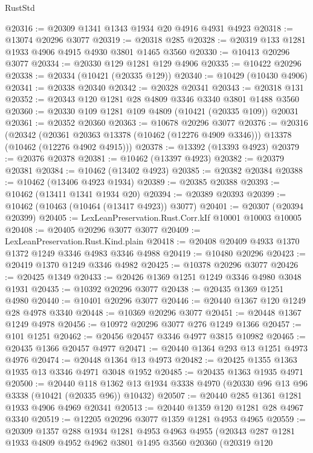 \begin{lexlean}{RustStd}
\begin{coremodule}
@20316 := @20309 @1341 @1343 @1934 @20 @4916 @4931 @4923
@20318 := @13074 @20296 @3077
@20319 := @20318 @285
@20328 := @20319 @133 @1281 @1933 @4906 @4915 @4930 @3801 @1465 @3560
@20330 := @10413 @20296 @3077
@20334 := @20330 @129 @1281 @129 @4906
@20335 := @10422 @20296
@20338 := @20334 (@10421 (@20335 @129))
@20340 := @10429 (@10430 @4906)
@20341 := @20338 @20340
@20342 := @20328 @20341
@20343 := @20318 @131
@20352 := @20343 @120 @1281 @28 @4809 @3346 @3340 @3801 @1488 @3560
@20360 := @20330 @109 @1281 @109 @4809 (@10421 (@20335 @109)) @20031
@20361 := @20352 @20360
@20363 := @10678 @20296 @3077
@20376 := @20316
    (@20342
      (@20361 @20363 @13378 (@10462 (@12276 @4909 @3346)))
      @13378
      (@10462 (@12276 @4902 @4915)))
@20378 := @13392 (@13393 @4923)
@20379 := @20376 @20378
@20381 := @10462 (@13397 @4923)
@20382 := @20379 @20381
@20384 := @10462 (@13402 @4923)
@20385 := @20382 @20384
@20388 := @10462 (@13406 @4923 @1934)
@20389 := @20385 @20388
@20393 := @10462 (@13411 @1341 @1934 @20)
@20394 := @20389 @20393
@20399 := @10462 (@10463 (@10464 (@13417 @4923)) @3077)
@20401 := @20307 (@20394 @20399)
@20405 := LexLeanPreservation.Rust.Corr.kIf @10001 @10003 @10005
@20408 := @20405 @20296 @3077 @3077
@20409 := LexLeanPreservation.Rust.Kind.plain
@20418 := @20408 @20409 @4933 @1370 @1372 @1249 @3346 @4983 @3346 @4988
@20419 := @10480 @20296
@20423 := @20419 @1370 @1249 @3346 @4982
@20425 := @10378 @20296 @3077
@20426 := @20425 @1349
@20433 := @20426 @1369 @1251 @1249 @3346 @4980 @3048 @1931
@20435 := @10392 @20296 @3077
@20438 := @20435 @1369 @1251 @4980
@20440 := @10401 @20296 @3077
@20446 := @20440 @1367 @120 @1249 @28 @4978 @3340
@20448 := @10369 @20296 @3077
@20451 := @20448 @1367 @1249 @4978
@20456 := @10972 @20296 @3077 @276 @1249 @1366
@20457 := @101 @1251
@20462 := @20456 @20457 @3346 @4977 @3815 @10982
@20465 := @20435 @1366 @20457 @4977
@20471 := @20440 @1364 @293 @13 @1251 @4973 @4976
@20474 := @20448 @1364 @13 @4973
@20482 := @20425 @1355 @1363 @1935 @13 @3346 @4971 @3048 @1952
@20485 := @20435 @1363 @1935 @4971
@20500 := @20440
    @118
    @1362
    @13
    @1934
    @3338
    @4970
    (@20330 @96 @13 @96 @3338 (@10421 (@20335 @96)) @10432)
@20507 := @20440 @285 @1361 @1281 @1933 @4906 @4969 @20341
@20513 := @20440 @1359 @120 @1281 @28 @4967 @3340
@20519 := @12205 @20296 @3077 @1359 @1281 @4953 @4965
@20559 := @20309
    @1357
    @288
    @1934
    @1281
    @4953
    @4963
    @4955
    (@20343
      @287
      @1281
      @1933
      @4809
      @4952
      @4962
      @3801
      @1495
      @3560
      @20360
      (@20319
        @120

\end{coremodule}
\end{lexlean}
